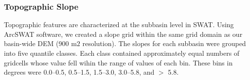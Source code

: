 \subsubsection{Topographic Slope}\label{sec:slope}

Topographic features are characterized at the subbasin level in SWAT. Using ArcSWAT software, we created a slope grid within the same grid domain as our basin-wide DEM (900 m$2$ resolution). The slopes for each subbasin were grouped into five quantile classes. Each class contained approximately equal numbers of gridcells whose value fell wihin the range of values of each bin. These bins in degrees were 0.0--0.5, 0.5--1.5, 1.5--3.0, 3.0--5.8, and $>$ 5.8.

